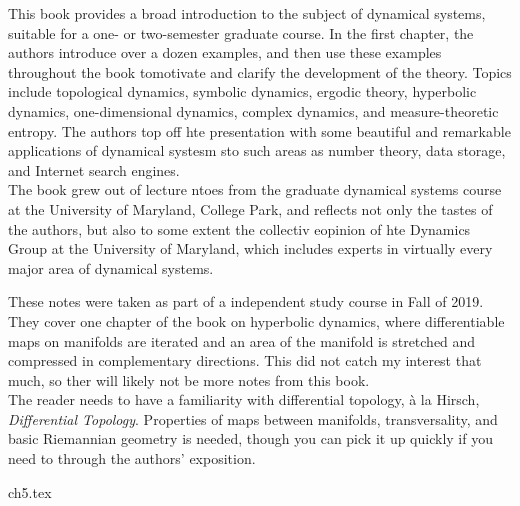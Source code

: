 \documentclass{../booknotes}
\begin{document}
\maketitle

\begin{pubdescrip}
	\indent \indent This book provides a broad introduction to the subject of dynamical systems, suitable for a one- or two-semester graduate course. In the first chapter, the authors introduce over a dozen examples, and then use these examples throughout the book tomotivate and clarify the development of the theory. Topics include topological dynamics, symbolic dynamics, ergodic theory, hyperbolic dynamics, one-dimensional dynamics, complex dynamics, and measure-theoretic entropy. The authors top off hte presentation with some beautiful and remarkable applications of dynamical systesm sto such areas as number theory, data storage, and Internet search engines.\\
\indent \indent The book grew out of lecture ntoes from the graduate dynamical systems course at the University of Maryland, College Park, and reflects not only the tastes of the authors, but also to some extent the collectiv eopinion of hte Dynamics Group at the University of Maryland, which includes experts in virtually every major area of dynamical systems.

\end{pubdescrip}

\begin{transcribernote}
	\indent These notes were taken as part of a independent study course in Fall of 2019. They cover one chapter of the book on hyperbolic dynamics, where differentiable maps on manifolds are iterated and an area of the manifold is stretched and compressed in complementary directions. This did not catch my interest that much, so ther will likely not be more notes from this book. \\
	\indent The reader needs to have a familiarity with differential topology, \`a la Hirsch, \textit{Differential Topology}. Properties of maps between manifolds, transversality, and basic Riemannian geometry is needed, though you can pick it up quickly if you need to through the authors' exposition. 
\end{transcribernote}

\tableofcontents

{ch5.tex}
\end{document}
